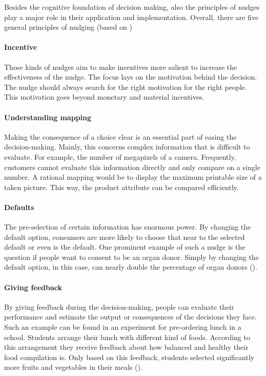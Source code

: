 Besides the cognitive foundation of decision making, also the principles of nudges play a major role in their application and implementation. Overall, there are five general principles of nudging (based on \cite{thaler_choice_2010})
\paragraph{Incentive}
Those kinds of nudges aim to make incentives more salient to increase the effectiveness of the nudge. The focus lays on the motivation behind the decision. The nudge should always search for the right motivation for the right people. This motivation goes beyond monetary and material incentives.
\paragraph{Understanding mapping}
Making the consequence of a choice clear is an essential part of easing the decision-making. Mainly, this concerns complex information that is difficult to evaluate. For example, the number of megapixels of a camera. Frequently, customers cannot evaluate this information directly and only compare on a single number. A rational mapping would be to display the maximum printable size of a taken picture. This way, the product attribute can be compared efficiently.
\paragraph{Defaults}
The pre-selection of certain information has enormous power. By changing the default option, consumers are more likely to choose that near to the selected default or even is the default. One prominent example of such a nudge is the question if people want to consent to be an organ donor. Simply by changing the default option, in this case, can nearly double the percentage of organ donors (\cite{johnson_defaults_2003}). 
\paragraph{Giving feedback}
By giving feedback during the decision-making, people can evaluate their performance and estimate the output or consequences of the decisions they face. Such an example can be found in an experiment for pre-ordering lunch in a school. Students arrange their lunch with different kind of foods. According to this arrangement they receive feedback about how balanced and healthy their food compilation is. Only based on this feedback, students selected significantly more fruits and vegetables in their meals (\cite{miller_effects_2016}).
